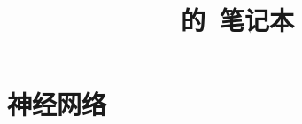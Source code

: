 \documentclass{ctexart}
\title{ \ysname\ 的\tikzname\ 笔记本}
\author{\ysname}
\begin{document}
\maketitle


\pagestyle{empty}
\newpage
\section{神经网络}


% 
\end{document}
